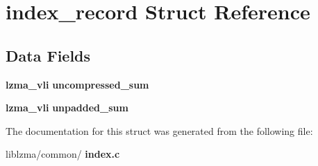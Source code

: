 \section{index\+\_\+record Struct Reference}
\label{structindex__record}
\subsection*{Data Fields}
\begin{DoxyCompactItemize}
\item 
\mbox{\label{structindex__record_a70cd20a2469a9960854863541e656ca2}} 
\textbf{ lzma\+\_\+vli} {\bfseries uncompressed\+\_\+sum}
\item 
\mbox{\label{structindex__record_a23f8fffcfc46cb2086e6fd3f635d73b7}} 
\textbf{ lzma\+\_\+vli} {\bfseries unpadded\+\_\+sum}
\end{DoxyCompactItemize}


The documentation for this struct was generated from the following file\+:\begin{DoxyCompactItemize}
\item 
liblzma/common/\textbf{ index.\+c}\end{DoxyCompactItemize}
